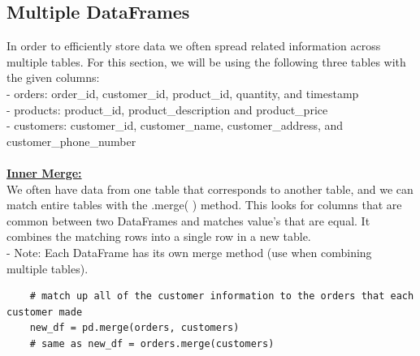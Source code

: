 \documentclass[11pt, a4paper]{article}
\begin{document}
\begin{spacing}{1.1}
	\subsection{Multiple DataFrames}
	In order to efficiently store data we often spread related information across multiple tables. For this section, we will be using the following three tables with the given columns: \vspace*{.5mm} \\
	- orders: order\_id, customer\_id, product\_id, quantity, and timestamp \vspace*{.5mm} \\
	- products: product\_id, product\_description and product\_price\vspace*{.5mm} \\
	- customers: customer\_id, customer\_name, customer\_address, and customer\_phone\_number \\~\\
	\underline{\textbf{Inner Merge:}} \\
	We often have data from one table that corresponds to another table, and we can match entire tables with the .merge( ) method. This looks for columns that are common between two DataFrames and matches value's that are equal. It combines the matching rows into a single row in a new table. \\
	\hspace*{3mm} - Note: Each DataFrame has its own merge method (use when combining multiple tables).
	\begin{lstlisting}
	# match up all of the customer information to the orders that each customer made
	new_df = pd.merge(orders, customers) 
	# same as new_df = orders.merge(customers)
	

\end{lstlisting}
\end{spacing}
\end{document}

